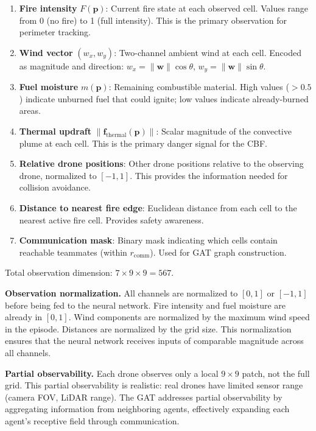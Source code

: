 \documentclass[12pt,a4paper]{article}
\DeclareRobustCommand{\vect}[1]{\bm{#1}}
\begin{document}
\begin{enumerate}[leftmargin=*]
    \item \textbf{Fire intensity} $F(\vect{p})$: Current fire state at each observed cell. Values range from 0 (no fire) to 1 (full intensity). This is the primary observation for perimeter tracking.
    \item \textbf{Wind vector} $(w_x, w_y)$: Two-channel ambient wind at each cell. Encoded as magnitude and direction: $w_x = \|\vect{w}\|\cos\theta$, $w_y = \|\vect{w}\|\sin\theta$.
    \item \textbf{Fuel moisture} $m(\vect{p})$: Remaining combustible material. High values ($> 0.5$) indicate unburned fuel that could ignite; low values indicate already-burned areas.
    \item \textbf{Thermal updraft} $\|\vect{f}_{\text{thermal}}(\vect{p})\|$: Scalar magnitude of the convective plume at each cell. This is the primary danger signal for the CBF.
    \item \textbf{Relative drone positions}: Other drone positions relative to the observing drone, normalized to $[-1, 1]$. This provides the information needed for collision avoidance.
    \item \textbf{Distance to nearest fire edge}: Euclidean distance from each cell to the nearest active fire cell. Provides safety awareness.
    \item \textbf{Communication mask}: Binary mask indicating which cells contain reachable teammates (within $r_{\text{comm}}$). Used for GAT graph construction.
\end{enumerate}

Total observation dimension: $7 \times 9 \times 9 = 567$.

\textbf{Observation normalization.} All channels are normalized to $[0, 1]$ or $[-1, 1]$ before being fed to the neural network. Fire intensity and fuel moisture are already in $[0, 1]$. Wind components are normalized by the maximum wind speed in the episode. Distances are normalized by the grid size. This normalization ensures that the neural network receives inputs of comparable magnitude across all channels.

\textbf{Partial observability.} Each drone observes only a local $9 \times 9$ patch, not the full grid. This partial observability is realistic: real drones have limited sensor range (camera FOV, LiDAR range). The GAT addresses partial observability by aggregating information from neighboring agents, effectively expanding each agent's receptive field through communication.
\end{document}
